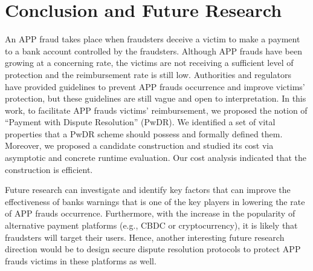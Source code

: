 
\section{Conclusion and Future Research}\label{sec::conclusion}


An APP fraud takes place when fraudsters deceive a victim to make a payment to a bank account controlled by the fraudsters. Although APP frauds have been growing at a concerning rate, the  victims are not receiving a sufficient level of protection and the reimbursement rate is still low. Authorities and regulators have  provided guidelines  to prevent APP frauds occurrence and improve victims’ protection, but these guidelines are still vague and open to interpretation. In this work, to facilitate APP frauds victims’ reimbursement,  we proposed the notion of “Payment with Dispute Resolution” (PwDR). We identified a set of vital properties that a PwDR scheme should possess and formally defined them. Moreover,  we proposed a candidate construction and  studied its cost via asymptotic and concrete runtime evaluation. Our cost analysis indicated that the construction is efficient. 



Future research can investigate and identify key factors   that can improve the effectiveness of banks warnings that is one of the  key players in   lowering the rate of APP frauds occurrence.  Furthermore, with the increase in the popularity of  alternative payment platforms (e.g., CBDC or cryptocurrency), it is likely that  fraudsters will target their users. Hence, another interesting future research direction would be to design secure dispute resolution protocols  to protect  APP frauds victims in these platforms as well. 



